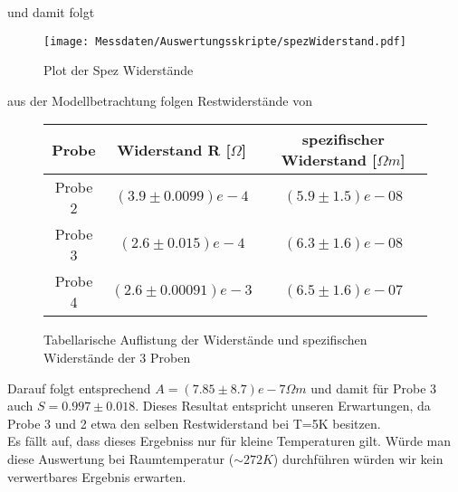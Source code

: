     und damit folgt
    \begin{figure}[H]
        \centering
        \texttt{[image: Messdaten/Auswertungsskripte/spezWiderstand.pdf]}
        \caption{Plot der Spez Widerstände}
        \label{spec resistance plot}
    \end{figure}
    aus der Modellbetrachtung folgen Restwiderstände von
    \begin{figure}[H]
        \centering
        \begin{tabular}{c|c|c}
            Probe & Widerstand R [$\Omega$] &spezifischer Widerstand [$\Omega m$] \\
            \hline
            Probe 2 & $(3.9\pm 0.0099)e-4 $ & $(5.9\pm 1.5)e-08$ \\
            Probe 3 & $(2.6\pm 0.015)e-4 $ & $(6.3\pm 1.6)e-08$ \\
            Probe 4 & $(2.6\pm 0.00091)e-3 $ & $(6.5\pm 1.6)e-07$ \\
        \end{tabular}
        \caption{Tabellarische Auflistung der Widerstände und spezifischen Widerstände der 3 Proben}
    \end{figure}
    Darauf folgt entsprechend $A=(7.85\pm8.7)e-7 \Omega m$ und damit für Probe 3 auch $S=0.997 \pm 0.018$. Dieses Resultat
    entspricht unseren Erwartungen, da Probe 3 und 2 etwa den selben Restwiderstand bei T=5K besitzen.\\
    Es fällt auf, dass dieses Ergebniss nur für kleine Temperaturen gilt. Würde man diese Auswertung bei
    Raumtemperatur ($\sim 272K$) durchführen würden wir kein verwertbares Ergebnis erwarten.%
